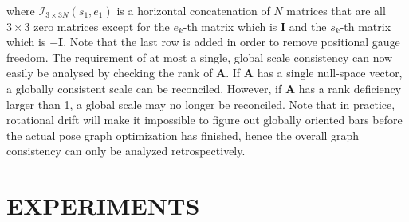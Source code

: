 \documentclass[letterpaper, 10 pt, conference]{ieeeconf}  %
\begin{document}
\normalsize
%
where $\mathcal{I}_{3\times 3N}(s_1,e_1)$ is a horizontal concatenation of $N$ matrices that are all $3 \times 3$ zero matrices except for the $e_k$-th matrix which is $\mathbf{I}$ and the $s_k$-th matrix which is $-\mathbf{I}$. Note that the last row is added in order to remove positional gauge freedom. The requirement of at most a single, global scale consistency can now easily be analysed by checking the rank of $\mathbf{A}$. If $\mathbf{A}$ has a single null-space vector, a globally consistent scale can be reconciled. However, if $\mathbf{A}$ has a rank deficiency larger than 1, a global scale may no longer be reconciled. Note that in practice, rotational drift will make it impossible to figure out globally oriented bars before the actual pose graph optimization has finished, hence the overall graph consistency can only be analyzed retrospectively.

\section{EXPERIMENTS}
\end{document}
